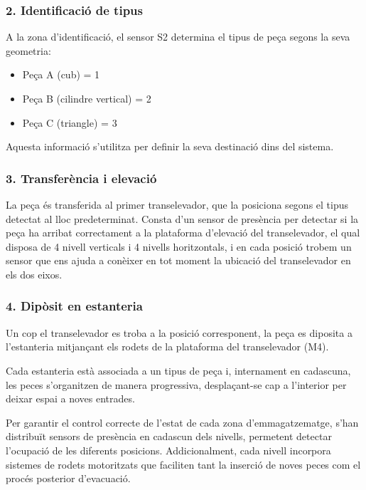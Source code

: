 \documentclass[a4paper,11pt,DIV=13,headings=normal,abstract=true,twoside=semi]{article}
\begin{document}
\subsubsection*{2. Identificació de tipus}

A la zona d'identificació, el sensor S2 determina el tipus de peça segons la seva geometria:

\begin{itemize}
\item Peça A (cub) = 1
\item Peça B (cilindre vertical) = 2
\item Peça C (triangle) = 3
\end{itemize}

Aquesta informació s'utilitza per definir la seva destinació dins del sistema.

\subsubsection*{3. Transferència i elevació}

La peça és transferida al primer transelevador, que la posiciona segons el tipus detectat al lloc predeterminat. Consta d'un sensor de presència per detectar si la peça ha arribat correctament a la plataforma d'elevació del transelevador, el qual disposa de 4 nivell verticals i 4 nivells horitzontals, i en cada posició trobem un sensor que ens ajuda a conèixer en tot moment la ubicació del transelevador en els dos eixos.

\subsubsection*{4. Dipòsit en estanteria}

Un cop el transelevador es troba a la posició corresponent, la peça es diposita a l'estanteria mitjançant els rodets de la plataforma del transelevador (M4). 

Cada estanteria està associada a un tipus de peça i, internament en cadascuna, les peces s'organitzen de manera progressiva, desplaçant-se cap a l'interior per deixar espai a noves entrades.

Per garantir el control correcte de l'estat de cada zona d'emmagatzematge, s'han distribuït sensors de presència en cadascun dels nivells, permetent detectar l'ocupació de les diferents posicions. Addicionalment, cada nivell incorpora sistemes de rodets motoritzats que faciliten tant la inserció de noves peces com el procés posterior d'evacuació.
\end{document}
